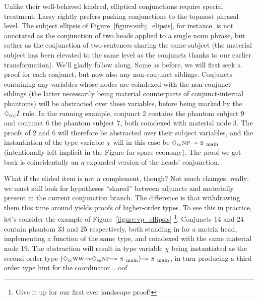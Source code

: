 Unlike their well-behaved kindred, elliptical conjunctions require special treatment.
Lassy rightly prefers pushing conjunctions to the topmost phrasal level.
The subject ellipsis of Figure~\ref{figure:subj_elipsis}, for instance, is not annotated as the conjunction of two heads applied to a single noun phrase, but rather as the conjunction of two sentences sharing the same subject (the material subject has been elevated to the same level as the conjuncts thanks to our earlier transformation).
We'll gladly follow along.
Same as before, we will first seek a proof for each conjunct, but now also any non-conjunct siblings. %
Conjuncts containing any variables whose nodes are coindexed with the non-conjunct siblings (the latter necessarily being material counterparts of conjunct-internal phantoms) will be abstracted over these variables, before being marked by the $\ddia{cnj} I$ rule.
In the running example,  conjunct 2 contains the phantom subject 9 and conjunct 6 the phantom subject 7, both coindexed with material node 3.
The proofs of 2 and 6 will therefore be abstracted over their subject variables, and the instantiation of the type variable $\chi$ will in this case be $\ddia{su}\np[s]\li\smain[s]$ (intentionally left implicit in the Figure for space economy).
The proof we get back is coincidentally an $\eta$-expanded version of the heads' conjunction.

What if the elided item is not a complement, though?
Not much changes, really: we must still look for hypotheses ``shared'' between adjuncts and materially present in the current conjunction branch.
The difference is that withdrawing them this time around yields proofs of higher-order types.
To see this in practice, let's consider the example of Figure~\ref{figure:vp_ellipsis}%
	\footnote{Give it up for our first ever landscape proof!}.
Conjuncts 14 and 24 contain phantom 33 and 25 respectively, both standing in for a matrix head, implementing a function of the same type, and coindexed with the same material node 19.
The abstraction will result in type variable $\chi$ being instantiated as the second order type $(\ddia{vc}\ww\li\ddia{su}\np\li\smain)\li\smain$, in turn producing a third order type hint for the coordinator... oof.

